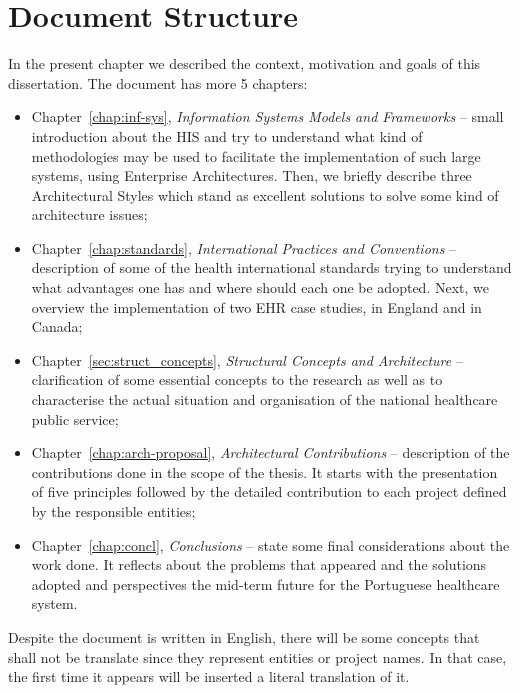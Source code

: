 \section{Document Structure} \label{sec:struct}

In the present chapter we described the context, motivation and goals of this dissertation. The document has more 5 chapters:
\begin{itemize}

\item Chapter~\ref{chap:inf-sys}, \textit{Information Systems Models and Frameworks} -- small introduction about the HIS and try to understand what kind of methodologies may be used to facilitate the implementation of such large systems, using Enterprise Architectures. Then, we briefly describe three Architectural Styles which stand as excellent solutions to solve some kind of architecture issues;

\item Chapter~\ref{chap:standards}, \textit{International Practices and Conventions} -- description of some of the health international standards trying to understand what advantages one has and where should each one be adopted. Next, we overview the implementation of two EHR case studies, in England and in Canada;

\item Chapter~\ref{sec:struct_concepts}, \textit{Structural Concepts and Architecture} -- clarification of some essential concepts to the research as well as to characterise the actual situation and organisation of the national healthcare public service;

\item Chapter~\ref{chap:arch-proposal}, \textit{Architectural Contributions} -- description of the contributions done in the scope of the thesis. It starts with the presentation of five principles followed by the detailed contribution to each project defined by the responsible entities;

\item Chapter~\ref{chap:concl}, \textit{Conclusions} -- state some final considerations about the work done. It reflects about the problems that appeared and the solutions adopted and perspectives the mid-term future for the Portuguese healthcare system.

\end{itemize}


Despite the document is written in English, there will be some concepts that shall not be translate since they represent entities or project names. In that case, the first time it appears will be inserted a literal translation of it.